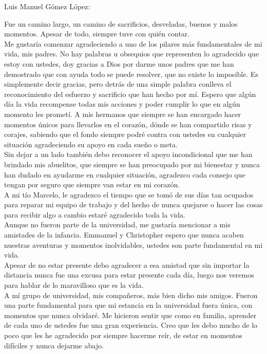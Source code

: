 \documentclass[12pt,letterpaper,spanish, xcolor=table]{report}
\numberwithin{figure}{subsection}
\newenvironment{dedication}{\newpage\large\null\em\vskip1in}%
{\vfill}
\begin{document}
		\begin{dedication}
			
			Luis Manuel Gómez López:
			
		Fue un camino largo, un camino de sacrificios, desveladas, buenos y malos momentos. Apesar de todo, siempre tuve con quién contar.\\
		
		Me gustaría comenzar agradeciendo a uno de los pilares más fundamentales de mi vida, mis padres. No hay palabras u obsequios que representen lo agradecido que estoy con ustedes, doy gracias a Dios por darme unos padres que me han demostrado que con ayuda todo se puede resolver, que no existe lo imposible. Es simplemente decir gracias, pero detrás de una simple palabra conlleva el reconocimiento del esfuerzo y sacrificio que han hecho por mí. Espero que algún día la vida recompense todas mis acciones y poder cumplir lo que en algún momento les prometí. A mis hermanos que siempre se han encargado hacer momentos únicos para llevarlos en el corazón, dónde se han compartido risas y corajes, sabiendo que el fondo siempre podré contra con ustedes en cualquier situación agradeciendo su apoyo en cada sueño o meta.\\
		
		Sin dejar a un lado también debo reconocer el apoyo incondicional que me han brindado mis abuelitos, que siempre se han preocupado por mi bienestar y nunca han dudado en ayudarme en cualquier situación, agradezco cada consejo que tengan por seguro que siempre van estar en mi corazón.\\
		
		A mi tío Marcelo, le agradezco el tiempo que se tomó de sus días tan ocupados para reparar mi equipo de trabajo y del hecho de nunca quejarse o hacer las cosas para recibir algo a cambio estaré agradecido toda la vida.\\
		
		Aunque no fueron parte de la universidad, me gustaría mencionar a mis amistades de la infancia. Emmanuel y Christopher espero que nunca acaben nuestras aventuras y momentos inolvidables, ustedes son parte fundamental en mi vida.\\
		
		Apesar de no estar presente debo agradecer a esa amistad que sin importar la distancia nunca fue una excusa para estar presente cada día, luego nos veremos para hablar de lo maravilloso que es la vida.\\ 
		
		A mí grupo de universidad, mis compañeros, más bien dicho mis amigos. Fueron una parte fundamental para que mi estancia en la universidad fuera única, con momentos que nunca olvidaré. Me hicieron sentir que como en familia, aprender de cada uno de ustedes fue una gran experiencia. Creo que les debo mucho de lo poco que les he agradecido por siempre hacerme reír, de estar en momentos difíciles y nunca dejarme abajo.\\
		

\end{dedication}
\end{document}
